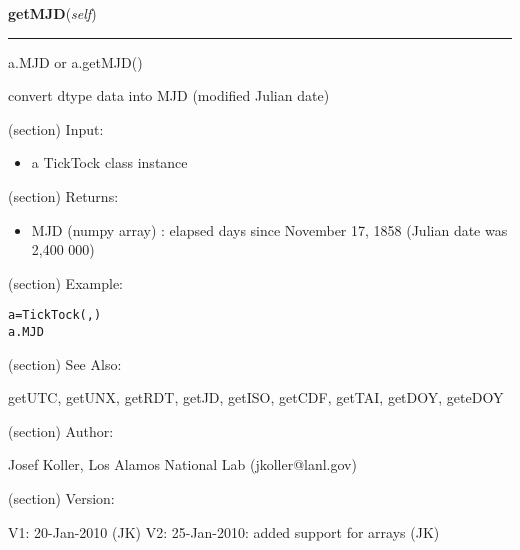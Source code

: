     \label{spacepy:spacetime:TickTock:getMJD}

    \vspace{0.5ex}

\hspace{.8\funcindent}\begin{boxedminipage}{\funcwidth}

    \raggedright \textbf{getMJD}(\textit{self})

    \vspace{-1.5ex}

    \rule{\textwidth}{0.5\fboxrule}
\setlength{\parskip}{2ex}
    a.MJD or a.getMJD()

    convert dtype data into MJD (modified Julian date)

    (section) Input:

      \begin{itemize}
      \setlength{\parskip}{0.6ex}
        \item a TickTock class instance

      \end{itemize}

    (section) Returns:

      \begin{itemize}
      \setlength{\parskip}{0.6ex}
        \item MJD (numpy array) : elapsed days since November 17, 1858 (Julian 
          date was 2,400 000)

      \end{itemize}

    (section) Example:

\begin{alltt}
\pysrcprompt{{\textgreater}{\textgreater}{\textgreater} }a = TickTock(, )
\pysrcprompt{{\textgreater}{\textgreater}{\textgreater} }a.MJD
\end{alltt}
    (section) See Also:

      getUTC, getUNX, getRDT, getJD, getISO, getCDF, getTAI, getDOY, 
      geteDOY

    (section) Author:

      Josef Koller, Los Alamos National Lab (jkoller@lanl.gov)

    (section) Version:

      V1: 20-Jan-2010 (JK) V2: 25-Jan-2010: added support for arrays (JK)

\setlength{\parskip}{1ex}
    \end{boxedminipage}

